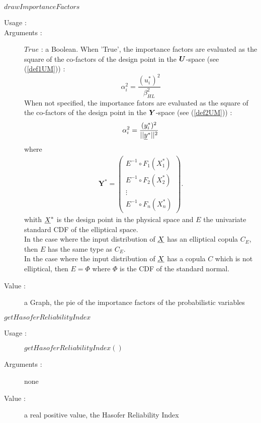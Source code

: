 \begin{description}
\begin{description}
  \item $drawImportanceFactors$
    \begin{description}
    \item[Usage :] \rule{0pt}{1em}
    \item[Arguments :] $True$ : a Boolean. When 'True', the importance factors are evaluated as the square of the co-factors of the design point in the ${\boldsymbol{U}}$-space (see (\ref{def1UM})) : 
\begin{equation}\label{def1UM}
    \alpha_i^2 = \displaystyle \frac{(u_i^{*})^2}{\beta_{HL}^2}
  \end{equation}
 When not specified, the importance fators are  evaluated as the square of the co-factors of the design point in the ${\boldsymbol{Y}}$-space (see (\ref{def2UM})) : 
\begin{equation}\label{def2UM}
    \alpha_i^2 = \displaystyle \frac{(y_i^{*})^2}{||{\underline{y}}^{*}||^2}
  \end{equation}
where 
  \begin{eqnarray}
    \boldsymbol{Y}^* =  \left(
      \begin{array}{c}
        E^{-1}\circ F_1(X_1^*) \\
        E^{-1}\circ F_2(X_2^*) \\
        \vdots \\
        E^{-1}\circ F_n(X_n^*)
      \end{array}
    \right).\label{varY10}
  \end{eqnarray}
whith ${\underline{X}}^*$ is the design point in the physical space and $E$ the univariate standard CDF of the elliptical space. \\
In the case where the input distribution of ${\underline{X}}$ has an elliptical copula $C_E$, then $E$ has the same type as  $C_E$.\\
In the case where the input distribution of ${\underline{X}}$ has a copula $C$ which is not elliptical, then  $E=\Phi$ where $\Phi$ is the CDF of the standard normal.
    \item[Value :]  a Graph, the pie of the importance factors of the probabilistic variables
    \end{description}
    \bigskip
    \bigskip

  \item $getHasoferReliabilityIndex$
    \begin{description}
    \item[Usage :] $getHasoferReliabilityIndex()$
    \item[Arguments :] none
    \item[Value :]  a real positive value, the Hasofer Reliability Index
    \end{description}
    \bigskip


\end{description}
\end{description}
